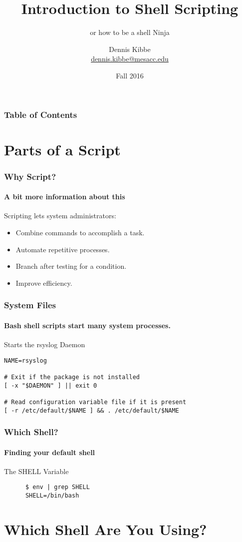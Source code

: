 \documentclass[handout]{beamer}
\title{Introduction to Shell Scripting}
\subtitle{or how to be a shell Ninja}
\author{Dennis Kibbe \\\href{mailto:dennis.kibbe@mesacc.edu}{dennis.kibbe@mesacc.edu}}
\institute{Mesa Community College \\Network Academy}
\date{Fall 2016}
\begin{document}
\maketitle
\begin{frame}
\frametitle{Table of Contents}
\tableofcontents[currentsection]
\end{frame}
\addtocounter{framenumber}{-1}
\section{Parts of a Script}
\begin{frame}
  \frametitle{Why Script?}
  \framesubtitle{A bit more information about this}
  Scripting lets system administrators:
  \begin{itemize}
  \item Combine commands to accomplish a task.
    \pause
  \item Automate repetitive processes.
    \pause
  \item Branch after testing for a condition.
    \pause
  \item Improve efficiency.
    \pause
  \end{itemize}
\end{frame}
\begin{frame}[fragile]
  \frametitle{System Files}
  \framesubtitle{Bash shell scripts start many system processes.}
  \begin{block}{Starts the rsyslog Daemon}
    \begin{verbatim}
NAME=rsyslog

# Exit if the package is not installed
[ -x "$DAEMON" ] || exit 0

# Read configuration variable file if it is present
[ -r /etc/default/$NAME ] && . /etc/default/$NAME
\end{verbatim}
\end{block}
\end{frame}
\begin{frame}[fragile]
  \frametitle{Which Shell?}
  \framesubtitle{Finding your default shell}
  \begin{block}{The SHELL Variable}
    \begin{verbatim}
      $ env | grep SHELL
      SHELL=/bin/bash
    \end{verbatim}
  \end{block}
\end{frame}

\section{Which Shell Are You Using?}
\end{document}
